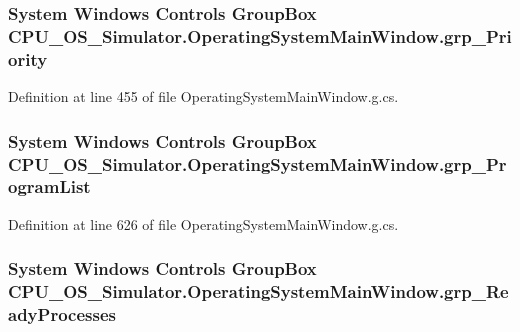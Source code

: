 \subsubsection[{grp\+\_\+\+Priority}]{\setlength{\rightskip}{0pt plus 5cm}System Windows Controls Group\+Box C\+P\+U\+\_\+\+O\+S\+\_\+\+Simulator.\+Operating\+System\+Main\+Window.\+grp\+\_\+\+Priority\hspace{0.3cm}{\ttfamily [package]}}\label{class_c_p_u___o_s___simulator_1_1_operating_system_main_window_a45f777ff3178acfefdffb311366ab786}


Definition at line 455 of file Operating\+System\+Main\+Window.\+g.\+cs.

\hypertarget{class_c_p_u___o_s___simulator_1_1_operating_system_main_window_a9dca0481c9d2ec99d42298352858be2b}{}
\subsubsection[{grp\+\_\+\+Program\+List}]{\setlength{\rightskip}{0pt plus 5cm}System Windows Controls Group\+Box C\+P\+U\+\_\+\+O\+S\+\_\+\+Simulator.\+Operating\+System\+Main\+Window.\+grp\+\_\+\+Program\+List\hspace{0.3cm}{\ttfamily [package]}}\label{class_c_p_u___o_s___simulator_1_1_operating_system_main_window_a9dca0481c9d2ec99d42298352858be2b}


Definition at line 626 of file Operating\+System\+Main\+Window.\+g.\+cs.

\hypertarget{class_c_p_u___o_s___simulator_1_1_operating_system_main_window_ac76887fb899577a2695f5a16c32993c3}{}
\subsubsection[{grp\+\_\+\+Ready\+Processes}]{\setlength{\rightskip}{0pt plus 5cm}System Windows Controls Group\+Box C\+P\+U\+\_\+\+O\+S\+\_\+\+Simulator.\+Operating\+System\+Main\+Window.\+grp\+\_\+\+Ready\+Processes\hspace{0.3cm}{\ttfamily [package]}}\label{class_c_p_u___o_s___simulator_1_1_operating_system_main_window_ac76887fb899577a2695f5a16c32993c3}


